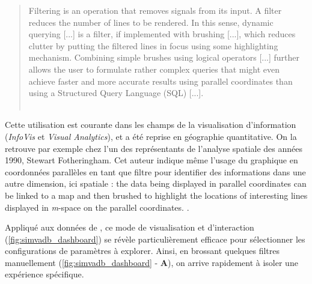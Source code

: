 \begin{quotation}\vspace{-0.5cm}
	\og Filtering is an operation that removes signals from its input. A filter reduces the number of lines to be rendered. In this sense, dynamic querying [...] is a filter, if implemented with brushing [...], which reduces clutter by putting the filtered lines in focus using some highlighting mechanism. Combining simple brushes using logical operators [...] further allows the user to formulate rather complex queries that might even achieve faster and more accurate results using parallel coordinates than using a Structured Query Language (SQL) [...].\fg{}\\
	\mbox{}~ \hfill \cite[p. 13]{heinrich_state_2013}
\end{quotation}


Cette utilisation est courante dans les champs de la visualisation d'information (\textit{InfoVis} et \textit{Visual Analytics}), et a été reprise en géographie quantitative.
On la retrouve par exemple chez l'un des représentants de l'analyse spatiale des années 1990, Stewart Fotheringham.
Cet auteur indique même l'usage du graphique en coordonnées parallèles en tant que filtre pour identifier des informations dans une autre dimension, ici spatiale : \og the data being displayed in parallel coordinates can be linked to a map and then brushed to highlight the locations of interesting lines displayed in \textit{m}-space on the parallel coordinates.\fg{} \autocite{fotheringham_trends_1999}.

Appliqué aux données de \simfeodal{}, ce mode de visualisation et d'interaction (\cref{fig:simvadb_dashboard}) se révèle particulièrement efficace pour sélectionner les configurations de paramètres à explorer.
Ainsi, en \og brossant \fg{} quelques filtres manuellement (\cref{fig:simvadb_dashboard} - \textbf{A}), on arrive rapidement à isoler une expérience spécifique.

